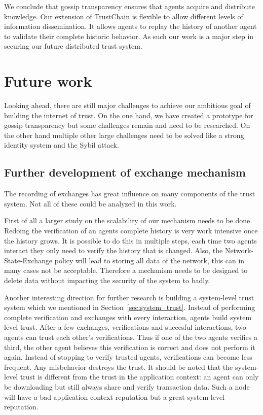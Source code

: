 We conclude that gossip transparency ensures that agents acquire and distribute knowledge. Our 
extension of TrustChain is flexible to allow different levels of information dissemination. It allows
agents to replay the history of another agent to validate their complete historic behavior. As such
our work is a major step in securing our future distributed trust system.

\section{Future work}
Looking ahead, there are still major challenges to achieve our ambitious goal of building the 
internet of trust. On the one hand, we have created a prototype for gossip transparency but some 
challenges remain and need to be researched. On the other hand multiple other large challenges need
to be solved like a strong identity system and the Sybil attack.

\subsection{Further development of exchange mechanism}
The recording of exchanges has great influence on many components of the trust system. Not all of 
these could be analyzed in this work. 

First of all a larger study on the scalability of our mechanism
needs to be done. Redoing the verification of an agents complete history is very work intensive once the 
history grows. It is possible to do this in multiple steps, each time two agents interact they only
need to verify the history that is changed. Also, the Network-State-Exchange policy will lead to 
storing all data of the network, this can in many cases not be acceptable. Therefore a mechanism 
needs to be designed to delete data without impacting the security of the system to badly. 

Another interesting direction for further research is building a system-level trust system which we
mentioned in Section~\ref{sec:system_trust}. Instead of performing complete verification and exchanges
with every interaction, agents build system level trust. After a few exchanges, verifications and 
succesful interactions, two agents can trust each other's verifications. Thus if one of the two 
agents verifies a third, the other agent believes this verification is correct and does not perform
it again. Instead of stopping to verify trusted agents, verifications can become less frequent. Any 
misbehavior destroys the trust. It should be noted that the system-level trust is different from the
trust in the application context: an agent can only be downloading but still always share and verify
transaction data. Such a node will have a bad application context reputation but a great system-level
reputation.

